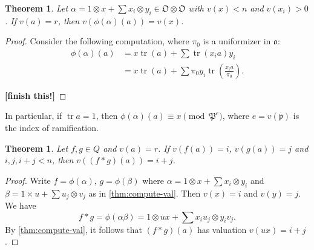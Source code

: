 \documentclass{article}
\DeclareMathOperator{\trace}{tr}
\newcommand{\fo}{\mathfrak{o}}
\newcommand{\fO}{\mathfrak{O}}
\newcommand{\fp}{\mathfrak{p}}
\newcommand{\fP}{\mathfrak{P}}
\newtheorem{theorem}[subsection]{Theorem}
\begin{document}
\begin{theorem}\label{thm:compute-val}
Let $\alpha=1\otimes x+\sum x_i\otimes y_i\in \fO\otimes\fO$ with $v(x)<n$ and 
$v(x_i)>0$. If $v(a)=r$, then $v(\phi(\alpha)(a))=v(x)$. 
\end{theorem}
\begin{proof}
Consider the following computation, where $\pi_0$ is a uniformizer in $\fo$:
\begin{align*}
  \phi(\alpha)(a) 
    &= x\trace(a) + \sum \trace(x_i a) y_i \\
    &= x\trace(a) + \sum \pi_0 y_i \trace\left(\frac{x_i a}{\pi_0}\right) .
\end{align*}

\textbf{[finish this!]}
\end{proof}

In particular, if $\trace a=1$, then $\phi(\alpha)(a)\equiv x\pmod{\fP^e}$, where 
$e=v(\fp)$ is the index of ramification. 

\begin{theorem}
Let $f,g\in Q$ and $v(a)=r$. If $v(f(a))=i$, $v(g(a))=j$ and 
$i,j,i+j<n$, then $v((f\ast g)(a))=i+j$. 
\end{theorem}
\begin{proof}
Write $f=\phi(\alpha)$, $g=\phi(\beta)$ where 
$\alpha=1\otimes x+\sum x_i\otimes y_i$ and 
$\beta=1\times u+\sum u_j\otimes v_j$ as in 
\autoref{thm:compute-val}. Then $v(x)=i$ and $v(y)=j$. We have 
\[
  f\ast g=\phi(\alpha\beta) = 1\otimes u x+\sum x_i u_j\otimes y_i v_j .
\]
By \autoref{thm:compute-val}, it follows that $(f\ast g)(a)$ has valuation 
$v(u x)=i+j$. 
\end{proof}





\printbibliography
\end{document}
